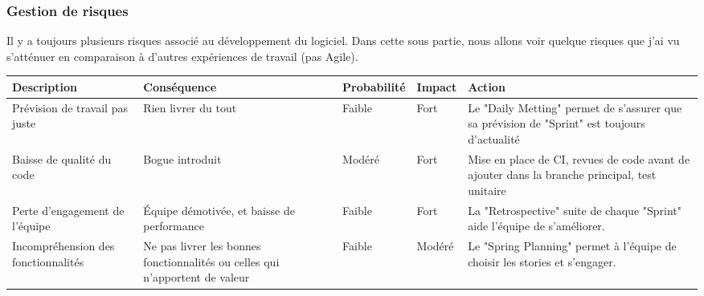 \subsubsection{Gestion de risques}
Il y a toujours plusieurs risques associé au développement du logiciel. Dans cette sous partie, nous allons voir quelque risques que j'ai vu s'atténuer en comparaison à d'autres expériences de travail (pas Agile). \cite{basile_plessis_2014}
\begin{center}
\begin{tabular}{p{3cm}|p{3cm}|l|l|p{5cm}}
Description & Conséquence & Probabilité & Impact & Action \\ \hline
Prévision de travail pas juste & Rien livrer du tout & Faible & Fort & Le "Daily Metting" permet de s'assurer que sa prévision de "Sprint" est toujours d'actualité \\
Baisse de qualité du code & Bogue introduit & Modéré & Fort & Mise en place de CI, revues de code avant de ajouter dans la branche principal, test unitaire \\
Perte d'engagement de l'équipe & Équipe démotivée, et baisse de performance & Faible & Fort & La "Retrospective" suite de chaque "Sprint" aide l'équipe de s'améliorer. \\
Incompréhension des fonctionnalités & Ne pas livrer les bonnes fonctionnalités ou celles qui n'apportent de valeur & Faible & Modéré & Le "Spring Planning" permet à l'équipe de choisir les stories et s'engager. \\


\end{tabular}
\end{center}
